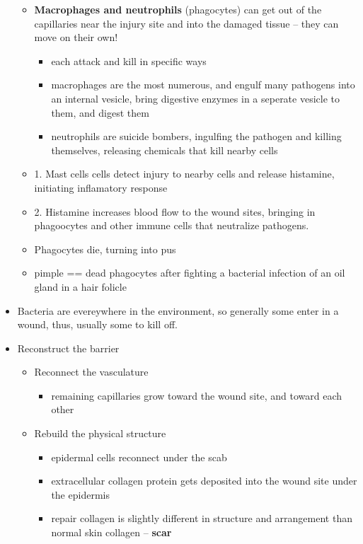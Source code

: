 \documentclass{article}
\theoremstyle{definition}
\begin{document}
\begin{itemize}
		\begin{itemize}
			\item \textbf{Macrophages and neutrophils}  (phagocytes) can get out of the capillaries near the injury site and into the damaged tissue -- they can move on their own!
				\begin{itemize}
					\item each attack and kill in specific ways
					\item macrophages are the most numerous, and engulf many pathogens into an internal vesicle, bring digestive enzymes in a seperate vesicle to them, and digest them
					\item neutrophils are suicide bombers, ingulfing the pathogen and killing themselves, releasing chemicals that kill nearby cells
				\end{itemize}
			\item 1. Mast cells cells detect injury to nearby cells and release histamine, initiating inflamatory response
			\item 2. Histamine increases blood flow to the wound sites, bringing in phagoocytes and other immune cells that neutralize pathogens. 
			\item Phagocytes die, turning into pus
			\item pimple == dead phagocytes after fighting a bacterial infection of an oil gland in a hair folicle
		\end{itemize}
	\item Bacteria are evereywhere in the environment, so generally some enter in a wound, thus, usually some to kill off.
	\item Reconstruct the barrier
		\begin{itemize}
			\item Reconnect the vasculature
				\begin{itemize}
					\item remaining capillaries grow toward the wound site, and toward each other
				\end{itemize}
			\item Rebuild the physical structure
				\begin{itemize}
					\item epidermal cells reconnect under the scab
					\item extracellular collagen protein gets deposited into the wound site under the epidermis
					\item repair collagen is slightly different in structure and arrangement than normal skin collagen -- \textbf{scar} 
				\end{itemize}
		\end{itemize}
\end{itemize}
\end{document}
